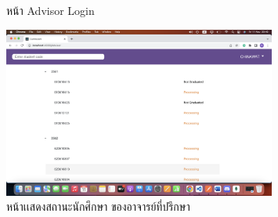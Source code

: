 \begin{figure}[H]
  \begin{center}
  \end{center}
  \caption{หน้า Advisor Login}
  \label{fig:advisor_login}
\end{figure}

\begin{figure}[H]
  \begin{center}
    \includegraphics[width=0.8\textwidth]{advisor.png}
    \caption{หน้าเเสดงสถานะนักศึกษา ของอาจารย์ที่ปรึกษา}
    \label{fig:advisor}
  \end{center}
\end{figure}

